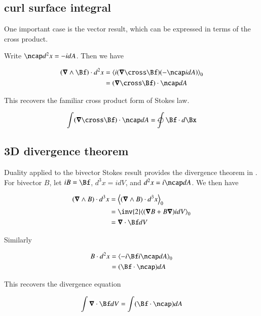 \subsection{curl surface integral}

One important case is the  vector result, which can be expressed in terms of the cross product.

Write $\ncap d^2 x = -i dA$.  Then we have

\begin{align*}
( \spacegrad \wedge \Bf ) \cdot d^2 x
&=
\gpgradezero{ i (\spacegrad \cross \Bf) (- \ncap i dA) } \\
&=
(\spacegrad \cross \Bf) \cdot \ncap dA
\end{align*}

This recovers the familiar cross product form of Stokes law.

\begin{align}
\int (\spacegrad \cross \Bf) \cdot \ncap dA = \ointclockwise \Bf \cdot d\Bx
\end{align}

\subsection{3D divergence theorem}

Duality applied to the bivector Stokes result provides the divergence theorem in .  For bivector $B$, let $iB = \Bf$, $d^3 x = i dV$, and $d^2 x = i \ncap dA$.  We then have

\begin{align*}
( \spacegrad \wedge B ) \cdot d^3 x
&=
\gpgradezero{ ( \spacegrad \wedge B ) \cdot d^3 x } \\
&=
\inv{2} \gpgradezero{ ( \spacegrad B + B \spacegrad ) i dV } \\
&=
\spacegrad \cdot \Bf dV \\
\end{align*}

Similarly

\begin{align*}
B \cdot d^2 x
&=
\gpgradezero{ 
-i\Bf i \ncap dA
} \\
&=
(\Bf \cdot \ncap) dA
 \\
\end{align*}

This recovers the  divergence equation

\begin{align}
\int \spacegrad \cdot \Bf dV = \int (\Bf \cdot \ncap) dA
\end{align}

